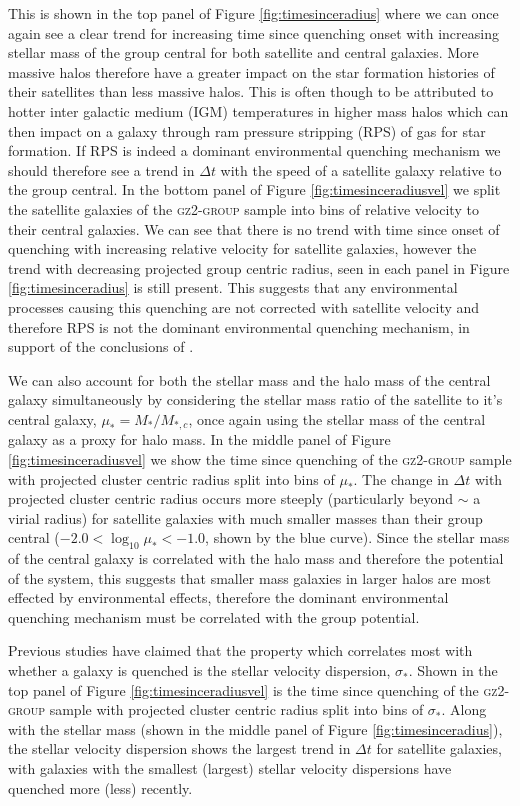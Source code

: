 \documentclass[useAMS,usenatbib]{mn2e}
\begin{document}
{This is shown in the top panel of Figure \ref{fig:timesinceradius} where we can once again see a clear trend for increasing time since quenching onset with increasing stellar mass of the group central for both satellite and central galaxies. More massive halos therefore have a greater impact on the star formation histories of their satellites than less massive halos. This is often though to be attributed to hotter inter galactic medium (IGM) temperatures in higher mass halos which can then impact on a galaxy through ram pressure stripping (RPS) of gas for star formation. If RPS is indeed a dominant environmental quenching mechanism we should therefore see a trend in $\Delta t$ with the speed of a satellite galaxy relative to the group central.  In the bottom panel of Figure \ref{fig:timesinceradiusvel} we split the satellite galaxies of the \textsc{gz2-group} sample into bins of relative velocity to their central galaxies. We can see that there is no trend with time since onset of quenching with increasing relative velocity for satellite galaxies, however the trend with decreasing projected group centric radius, seen in each panel in Figure \ref{fig:timesinceradius} is still present. This suggests that any environmental processes causing this quenching are not corrected with satellite velocity and therefore RPS is not the dominant environmental quenching mechanism, in support of the conclusions of \citep{?}.

We can also account for both the stellar mass and the halo mass of the central galaxy simultaneously by considering the stellar mass ratio of the satellite to it's central galaxy, $\mu_* = M_*/M_{*,c}$, once again using the stellar mass of the central galaxy as a proxy for halo mass. In the middle panel of Figure \ref{fig:timesinceradiusvel} we show the time since quenching of the \textsc{gz2-group} sample with projected cluster centric radius split into bins of $\mu_*$. The change in $\Delta t $ with projected cluster centric radius occurs more steeply (particularly beyond $\sim$ a virial radius) for satellite galaxies with much smaller masses than their group central ($-2.0 < \log_{10}\mu_* < -1.0$, shown by the blue curve). Since the stellar mass of the central galaxy is correlated with the halo mass and therefore the potential of the system, this suggests that smaller mass galaxies in larger halos are most effected by environmental effects, therefore the dominant environmental quenching mechanism must be correlated with the group potential. 

Previous studies have claimed that the property which correlates most with whether a galaxy is quenched is the stellar velocity dispersion, $\sigma_*$. Shown in the top panel of Figure \ref{fig:timesinceradiusvel} is the time since quenching of the \textsc{gz2-group} sample with projected cluster centric radius split into bins of $\sigma_*$. Along with the stellar mass (shown in the middle panel of Figure \ref{fig:timesinceradius}), the stellar velocity dispersion shows the largest trend in $\Delta t$  for satellite galaxies, with galaxies with the smallest (largest) stellar velocity dispersions have quenched more (less) recently. 

}
\end{document}
